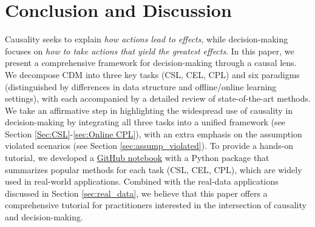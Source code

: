 \section{Conclusion and Discussion}\label{sec:conclusion}

Causality seeks to explain \textit{how actions lead to effects}, while decision-making focuses on \textit{how to take actions that yield the greatest effects}. In this paper, we present a comprehensive framework for decision-making through a causal lens. We decompose \acrshort{CDM} into three key tasks (\acrshort{CSL}, \acrshort{CEL}, \acrshort{CPL}) and six paradigms (distinguished by differences in data structure and offline/online learning settings), with each accompanied by a detailed review of state-of-the-art methods. We take an affirmative step in highlighting the widespread use of causality in decision-making by integrating all three tasks into a unified framework (see Section \ref{Sec:CSL}-\ref{sec:Online CPL}), with an extra emphasis on the assumption violated scenarios (see Section \ref{sec:assump_violated}). %
To provide a hands-on tutorial, we developed a \href{https://causaldm.github.io/Causal-Decision-Making}{GitHub notebook} with a Python package that summarizes popular methods for each task (\acrshort{CSL}, \acrshort{CEL}, \acrshort{CPL}), which are widely used in real-world applications. Combined with the real-data applications discussed in Section \ref{sec:real_data}, we believe that this paper offers a comprehensive tutorial for practitioners interested in the intersection of causality and decision-making. 


